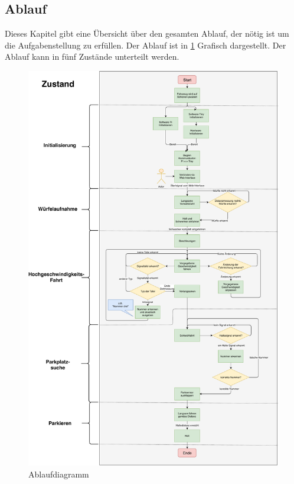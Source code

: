 \documentclass[../../main.tex]{subfiles}
\begin{document}
    \subsection{Ablauf} \label{ablauf}
    Dieses Kapitel gibt eine Übersicht über den gesamten Ablauf, der nötig ist um die Aufgabenstellung zu erfüllen. Der Ablauf ist in \ref{fig:Ablaufdiagramm} Grafisch dargestellt. Der Ablauf kann in fünf Zustände unterteilt werden.\\

    \begin{figure}
        \centering
        \includegraphics[width=1.0\textwidth]{Ablaufdiagramm.pdf}
        \caption {Ablaufdiagramm}
        \label{fig:Ablaufdiagramm}
    \end{figure}
\end{document}
